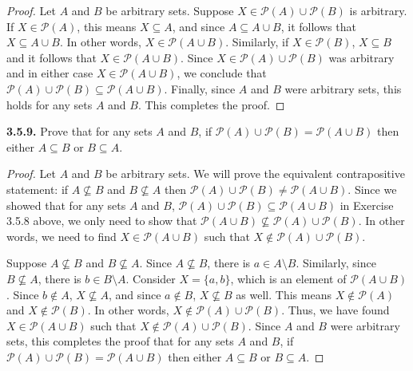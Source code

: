 \documentclass[12pt]{amsart}
\newenvironment{statement}[1]{\smallskip\noindent\color[rgb]{.6627, .3529, .6314} {\bf #1.}}{}
\theoremstyle{definition}
\theoremstyle{remark}
\newcommand{\powerset}[1]{\mathscr{P} \left( #1 \right)}
\begin{document}
\begin{proof}
Let $A$ and $B$ be arbitrary sets.
Suppose $X \in \powerset{A} \cup \powerset{B}$ is arbitrary.
If $X \in \powerset{A}$, this means $X \subseteq A$, and since $A \subseteq A \cup B$, it follows that $X \subseteq A \cup B$.
In other words, $X \in \powerset{A \cup B}$.
Similarly, if $X \in \powerset{B}$, $X \subseteq B$ and it follows that $X \in \powerset{A \cup B}$.
Since $X \in \powerset{A} \cup \powerset{B}$ was arbitrary and in either case $X \in \powerset{A \cup B}$, we conclude that $\powerset{A} \cup \powerset{B} \subseteq \powerset{A \cup B}$.
Finally, since $A$ and $B$ were arbitrary sets, this holds for any sets $A$ and $B$.
This completes the proof.
\end{proof}


\begin{statement}{3.5.9}
Prove that for any sets $A$ and $B$, if $\powerset{A} \cup \powerset{B} = \powerset{A \cup B}$ then either $A \subseteq B$ or $B \subseteq A$.
\end{statement}

\begin{proof}
Let $A$ and $B$ be arbitrary sets.
We will prove the equivalent contrapositive statement: if $A \nsubseteq B$ and $B \nsubseteq A$ then $\powerset{A} \cup \powerset{B} \neq \powerset{A \cup B}$.
Since we showed that  for any sets $A$ and $B$, $\powerset{A} \cup \powerset{B} \subseteq \powerset{A \cup B}$ in Exercise 3.5.8 above, we only need to show that $\powerset{A \cup B} \nsubseteq \powerset{A} \cup \powerset{B}$.
In other words, we need to find $X \in \powerset{A \cup B}$ such that $X \notin \powerset{A} \cup \powerset{B}$.

Suppose $A \nsubseteq B$ and $B \nsubseteq A$.
Since $A \nsubseteq B$, there is $a \in A \setminus B$.
Similarly, since $B \nsubseteq A$, there is $b \in B \setminus A$.
Consider $X = \{ a, b \}$, which is an element of $\powerset{A \cup B}$.
Since $b \notin A$, $X \nsubseteq A$, and since $a \notin B$, $X \nsubseteq B$ as well.
This means $X \notin \powerset{A}$ and $X \notin \powerset{B}$.
In other words, $X \notin \powerset{A} \cup \powerset{B}$.
Thus, we have found $X \in \powerset{A \cup B}$ such that $X \notin \powerset{A} \cup \powerset{B}$.
Since $A$ and $B$ were arbitrary sets, this completes the proof that  for any sets $A$ and $B$, if $\powerset{A} \cup \powerset{B} = \powerset{A \cup B}$ then either $A \subseteq B$ or $B \subseteq A$.
\end{proof}
\end{document}

